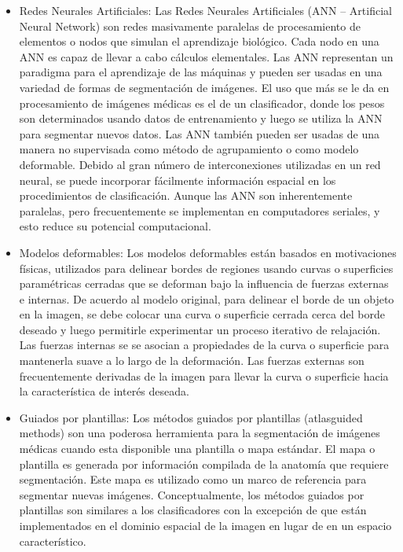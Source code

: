 \begin{itemize}
\item Redes Neurales Artificiales: Las Redes Neurales Artificiales (ANN – Artificial Neural Network) son redes masivamente paralelas de procesamiento de elementos o nodos que simulan el aprendizaje
biol\'ogico. Cada nodo en una ANN es capaz de llevar a cabo c\'alculos elementales. Las ANN representan un paradigma para el aprendizaje de las m\'aquinas y pueden ser usadas en una variedad de formas de segmentaci\'on de im\'agenes. El uso que m\'as se le da en procesamiento de im\'agenes m\'edicas es el de un clasificador, donde los pesos son determinados usando datos de entrenamiento y luego se utiliza la ANN para segmentar nuevos datos. Las ANN tambi\'en pueden ser usadas de una manera no supervisada como m\'etodo de agrupamiento o como modelo deformable. Debido al gran n\'umero de interconexiones utilizadas en un red neural, se puede incorporar f\'acilmente informaci\'on espacial en los procedimientos de clasificaci\'on. Aunque las ANN son inherentemente paralelas, pero frecuentemente se implementan en computadores seriales, y esto reduce su potencial computacional.
\item Modelos deformables: Los modelos deformables est\'an basados en motivaciones f\'isicas, utilizados para delinear bordes de regiones usando curvas o superficies param\'etricas cerradas que se deforman bajo la influencia de fuerzas externas e internas. De acuerdo al modelo original, para delinear el borde de un objeto en la imagen, se debe colocar una curva o superficie cerrada cerca del borde deseado y luego permitirle experimentar un proceso iterativo de relajación. Las fuerzas internas se se asocian a propiedades de la curva o superficie para mantenerla suave a lo largo de la deformaci\'on. Las fuerzas externas son frecuentemente derivadas de la imagen para llevar la curva o superficie hacia la caracter\'istica de inter\'es deseada.
\item Guiados por plantillas: Los m\'etodos guiados por plantillas (atlasguided methods) son una poderosa
herramienta para la segmentación de im\'agenes m\'edicas cuando esta disponible una plantilla o mapa est\'andar. El mapa o plantilla es generada por informaci\'on compilada de la anatom\'ia que requiere segmentaci\'on. Este mapa es utilizado como un marco de referencia para segmentar nuevas im\'agenes. Conceptualmente, los m\'etodos guiados por plantillas son similares a los clasificadores con la excepci\'on de que est\'an implementados en el dominio espacial de la imagen en lugar de en un espacio caracter\'istico.

\end{itemize}

